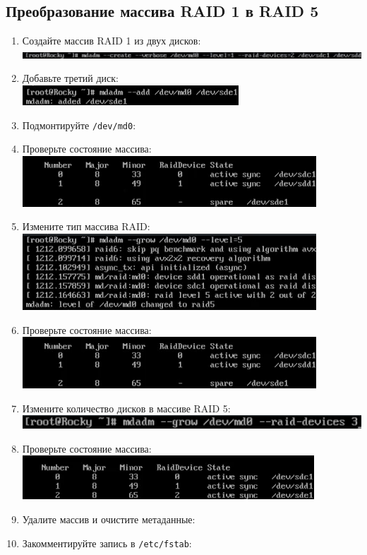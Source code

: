 \documentclass[12pt]{article}
\begin{document}
\subsection{Преобразование массива RAID 1 в RAID 5}
\begin{enumerate}
	\item Создайте массив RAID 1 из двух дисков:
	      \\\includegraphics{18.png}
	\item Добавьте третий диск:
	      \\\includegraphics{19.png}
	\item Подмонтируйте \texttt{/dev/md0}:
	\item Проверьте состояние массива:
	      \\\includegraphics{20.png}
	\item Измените тип массива RAID:
	      \\\includegraphics{21.png}
	\item Проверьте состояние массива:
	      \\\includegraphics{22.png}
	\item Измените количество дисков в массиве RAID 5:
	      \\\includegraphics{23.png}
	\item Проверьте состояние массива:
	      \\\includegraphics{24.png}
	\item Удалите массив и очистите метаданные:
	\item Закомментируйте запись в \texttt{/etc/fstab}:
\end{enumerate}
\end{document}
